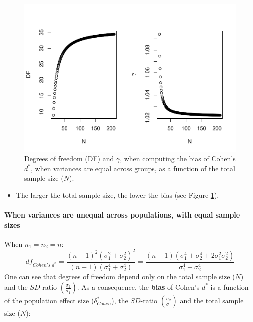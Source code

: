 \documentclass[
  english,
  man,mask]{apa6}
\providecommand{\tightlist}{%
  \setlength{\itemsep}{0pt}\setlength{\parskip}{0pt}}
\let\oldparagraph\paragraph
\renewcommand{\paragraph}[1]{\oldparagraph{#1}\mbox{}}
\begin{document}
\begin{figure}
\centering
\includegraphics{Theoretical-Bias-of-all-estimators-as-a-function-of-population-parameters_files/figure-latex/biascohendprimehomNsize2-1.pdf}
\caption{\label{fig:biascohendprimehomNsize2}Degrees of freedom (DF) and \(\gamma\), when computing the bias of Cohen's \(d^*\), when variances are equal across groups, as a function of the total sample size (\(N\)).}
\end{figure}

\begin{itemize}
\tightlist
\item
  The larger the total sample size, the lower the bias (see Figure \ref{fig:biascohendprimehomNsize2}).
\end{itemize}

\hypertarget{when-variances-are-unequal-across-populations-with-equal-sample-sizes}{%
\paragraph{When variances are unequal across populations, with equal sample sizes}\label{when-variances-are-unequal-across-populations-with-equal-sample-sizes}}

When \(n_1 = n_2 = n\):
\[df_{Cohen's \; d^*} = \frac{(n-1)^2(\sigma^2_1+\sigma^2_2)^2}{(n-1)(\sigma^4_1+\sigma^4_2)} =  \frac{(n-1)(\sigma^4_1+\sigma^4_2+2\sigma^2_1\sigma^2_2)}{\sigma^4_1+\sigma^4_2}\]
One can see that degrees of freedom depend only on the total sample size (\(N\)) and the \(SD\)-ratio \(\left( \frac{\sigma_2}{\sigma_1}\right)\). As a consequence, the \textbf{bias} of Cohen's \(d^*\) is a function of the population effect size (\(\delta^*_{Cohen}\)), the \(SD\)-ratio \(\left( \frac{\sigma_2}{\sigma_1}\right)\) and the total sample size (\(N\)):
\end{document}
